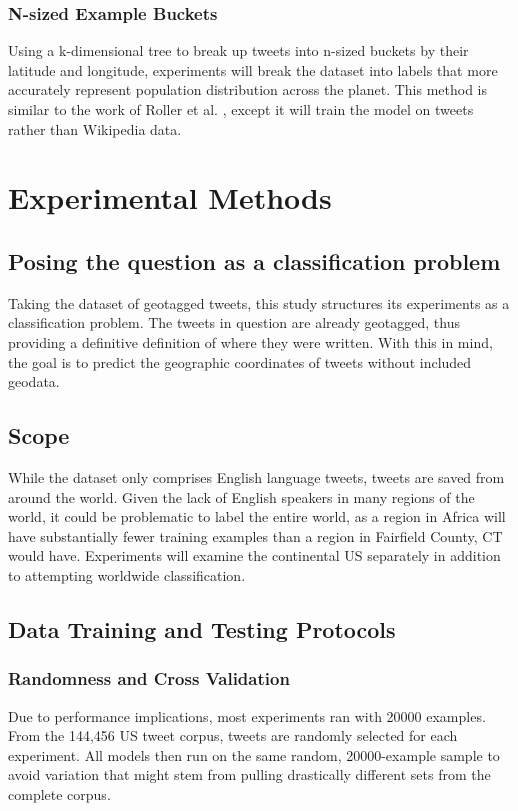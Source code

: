 \documentclass[midd]{thesis}
\begin{document}
\subsection{N-sized Example Buckets}
Using a k-dimensional tree to break up tweets into n-sized buckets by their latitude and longitude, experiments will break the dataset into labels that more accurately represent population distribution across the planet. This method is similar to the work of Roller et al. \cite{roller2012supervised}, except it will train the model on tweets rather than Wikipedia data.
\chapter{Experimental Methods}

\section{Posing the question as a classification problem}
Taking the dataset of geotagged tweets, this study structures its experiments as a classification problem. The tweets in question are already geotagged, thus providing a definitive definition of where they were written. With this in mind, the goal is to predict the geographic coordinates of tweets without included geodata.

\section{Scope}
While the dataset only comprises English language tweets, tweets are saved from around the world. Given the lack of English speakers in many regions of the world, it could be problematic to label the entire world, as a region in Africa will have substantially fewer training examples than a region in Fairfield County, CT would have. Experiments will examine the continental US separately in addition to attempting worldwide classification.



\section{Data Training and Testing Protocols}

\subsection{Randomness and Cross Validation}
Due to performance implications, most experiments ran with 20000 examples. From the 144,456 US tweet corpus, tweets are randomly selected for each experiment. All models then run on the same random, 20000-example sample to avoid variation that might stem from pulling drastically different sets from the complete corpus.
\end{document}
